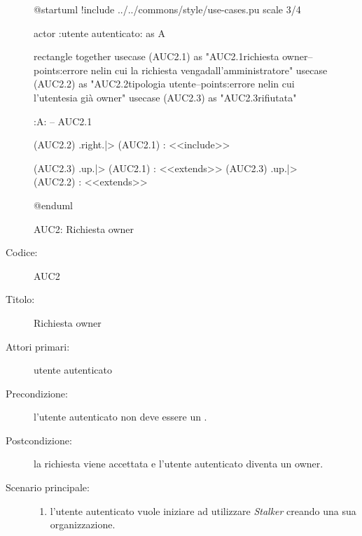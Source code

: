 \documentclass[../analisi-dei-requisiti.tex]{subfiles}
\begin{document}
\begin{figure}[h!]
  \centering
  \begin{plantuml}
  @startuml
  !include ../../commons/style/use-cases.pu
  scale 3/4

  actor :utente autenticato: as A

  rectangle {
    together {
      usecase (AUC2.1) as "AUC2.1\nInvio richiesta owner\n--\nExtension points:\nVisualizzazione errore nel\ncaso in cui la richiesta venga\nrifiutata dall'amministratore"
      usecase (AUC2.2) as "AUC2.2\nVerifica tipologia utente\n--\nExtension points:\nVisualizzazione errore nel\ncaso in cui l'utente\nautenticato sia già owner"
    }
      usecase (AUC2.3) as "AUC2.3\nRichiesta rifiutata"
    }

  :A: -- AUC2.1

  (AUC2.2) .right.|> (AUC2.1) : <<include>>

  (AUC2.3) .up.|> (AUC2.1) : <<extends>>
  (AUC2.3) .up.|> (AUC2.2) : <<extends>>

  @enduml
  \end{plantuml}
  \caption{AUC2: Richiesta owner}
  \label{fig:auc2}
\end{figure}

\begin{description}
  \item[Codice:] AUC2
  \item[Titolo:] Richiesta owner
  \item[Attori primari:] utente autenticato
  \item[Precondizione:] l'utente autenticato non deve essere un .
  \item[Postcondizione:] la richiesta viene accettata e l'utente autenticato diventa un owner.
  \item[Scenario principale:]
  \begin{enumerate}
    \item l'utente autenticato vuole iniziare ad utilizzare \emph{Stalker} creando una sua organizzazione.
  \end{enumerate}
\end{description}
\end{document}

